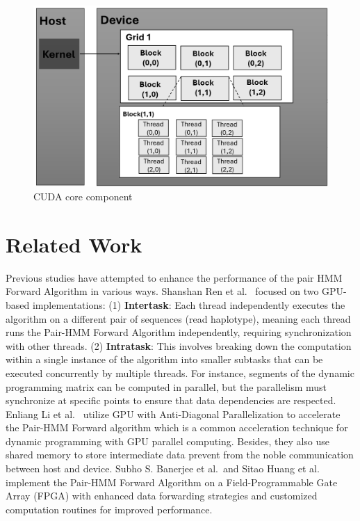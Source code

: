 \documentclass[PhD]{PHlab-thesis}
\begin{document}
\begin{figure}[h]
    \centering
    \includegraphics[width=1\linewidth]{figure/grid_block_thread.png}
    \caption{CUDA core component}
    \label{fig:core component}
\end{figure}


\chapter{Related Work}
Previous studies have attempted to enhance the performance of the pair HMM Forward Algorithm in various ways. Shanshan Ren et al.~\cite{Shanshan} focused on two GPU-based implementations: (1) \textbf{Intertask}: Each thread independently executes the algorithm on a different pair of sequences (read haplotype), meaning each thread runs the Pair-HMM Forward Algorithm independently, requiring synchronization with other threads. (2) \textbf{Intratask}: This involves breaking down the computation within a single instance of the algorithm into smaller subtasks that can be executed concurrently by multiple threads. For instance, segments of the dynamic programming matrix can be computed in parallel, but the parallelism must synchronize at specific points to ensure that data dependencies are respected. Enliang Li et al.~\cite{EnliangLi} utilize GPU with Anti-Diagonal Parallelization to accelerate the Pair-HMM Forward algorithm which is a common acceleration technique for dynamic programming with GPU parallel computing. Besides, they also use shared memory to store intermediate data prevent from the noble communication between host and device. Subho S. Banerjee et al.~\cite{Subho}and Sitao Huang et al.~\cite{Sitao} implement the Pair-HMM Forward Algorithm on a Field-Programmable Gate Array (FPGA) with enhanced data forwarding strategies and customized computation routines for improved performance.
\end{document}
